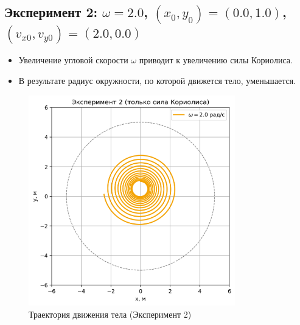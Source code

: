 \documentclass[a4paper,12pt]{article}
\begin{document}
\subsection*{Эксперимент 2: $\omega = 2.0$, $(x_0, y_0) = (0.0, 1.0)$, $(v_{x0}, v_{y0}) = (2.0, 0.0)$}
\begin{itemize}
    \item Увеличение угловой скорости $\omega$ приводит к увеличению силы Кориолиса.
    \item В результате радиус окружности, по которой движется тело, уменьшается.
\end{itemize}
\begin{figure}[H]
    \centering
    \includegraphics[width=0.8\textwidth]{plots_coriolis_only/experiment_2.png}
    \caption{Траектория движения тела (Эксперимент 2)}
\end{figure}

\newpage
\end{document}
